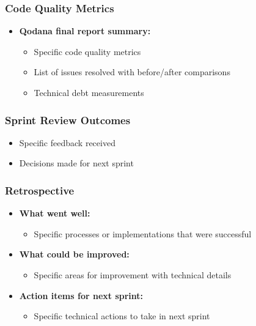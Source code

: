 \subsubsection{Code Quality Metrics}
\begin{itemize}
    \item \textbf{Qodana final report summary:}
    \begin{itemize}
        \item Specific code quality metrics
        \item List of issues resolved with before/after comparisons
        \item Technical debt measurements
    \end{itemize}
\end{itemize}

\subsubsection{Sprint Review Outcomes}
\begin{itemize}
    \item Specific feedback received
    \item Decisions made for next sprint
\end{itemize}

\subsubsection{Retrospective}
\begin{itemize}
    \item \textbf{What went well:}
    \begin{itemize}
        \item Specific processes or implementations that were successful
    \end{itemize}
    \item \textbf{What could be improved:}
    \begin{itemize}
        \item Specific areas for improvement with technical details
    \end{itemize}
    \item \textbf{Action items for next sprint:}
    \begin{itemize}
        \item Specific technical actions to take in next sprint
    \end{itemize}
\end{itemize}


